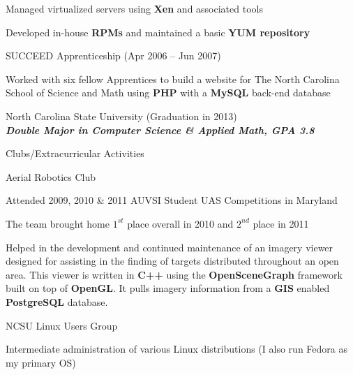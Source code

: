 \documentclass[11pt]{article}
\begin{document}
\begin{itemz}
\begin{itemz}[-]
\begin{itemz}[*]
                            \item Managed virtualized servers using {\bf Xen} and associated tools
                            \item Developed in-house {\bf RPMs} and maintained a basic {\bf YUM repository}
                        \end{itemz}
                    \item SUCCEED Apprenticeship (Apr 2006 -- Jun 2007)
                        \begin{itemz}[*]
                            \item Worked with six fellow Apprentices to build a website for The North Carolina School of Science and Math using {\bf PHP} with a {\bf MySQL} back-end database
                        \end{itemz}
                \end{itemz}
        \end{itemz}

        \begin{itemz}
            \item North Carolina State University (Graduation in 2013) \\ {\bf \scriptsize \emph{Double Major in Computer Science \& Applied Math, GPA 3.8}}            \\
        \end{itemz}

        \begin{itemz}
            \setlength{\itemsep}{0pt}
            \setlength{\parskip}{0pt}
            \setlength{\parsep}{0pt}
            \item Clubs/Extracurricular Activities
                \begin{itemz}[-]
                    \item Aerial Robotics Club
                        \begin{itemz}[*]
                            \item Attended 2009, 2010 \& 2011 AUVSI Student UAS Competitions in Maryland
                            \item The team brought home $1^{st}$ place overall in 2010 and $2^{nd}$ place in 2011
                            \item Helped in the development and continued maintenance of an imagery viewer designed for assisting in the finding of targets distributed throughout an open area.  This viewer is written in {\bf C++} using the {\bf OpenSceneGraph} framework built on top of {\bf OpenGL}.  It pulls imagery information from a {\bf GIS} enabled {\bf PostgreSQL} database.
                        \end{itemz}
                    \item NCSU Linux Users Group
                \end{itemz}
            \item Intermediate administration of various Linux distributions (I also run Fedora as my primary OS)
        \end{itemz}
\end{document}
